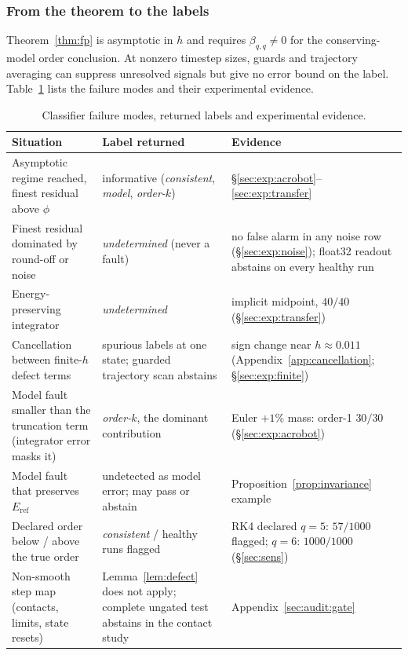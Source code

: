 \documentclass[10pt]{article}
\theoremstyle{definition}
\newcommand{\Eref}{E_{\mathrm{ref}}}
\begin{document}
\subsubsection{From the theorem to the labels}\label{sec:bridge}

Theorem~\ref{thm:fp} is asymptotic in $h$ and requires $\beta_{q,q}\ne0$ for
the conserving-model order conclusion. At nonzero timestep sizes, guards and trajectory
averaging can suppress unresolved signals but give no error bound on the
label. Table~\ref{tab:failure} lists the failure modes and their experimental
evidence.

\begin{table}[htbp]
\centering\small
\begin{tabular}{>{\raggedright\arraybackslash}p{4.9cm}>{\raggedright\arraybackslash}p{4.2cm}>{\raggedright\arraybackslash}p{5.6cm}}
\toprule
Situation & Label returned & Evidence \\
\midrule
Asymptotic regime reached, finest residual above $\phi$ & informative (\emph{consistent}, \emph{model}, \emph{order-$k$}) & \S\ref{sec:exp:acrobot}--\ref{sec:exp:transfer} \\
Finest residual dominated by round-off or noise & \emph{undetermined} (never a fault) & no false alarm in any noise row (\S\ref{sec:exp:noise}); float32 readout abstains on every healthy run \\
Energy-preserving integrator & \emph{undetermined} & implicit midpoint, $40/40$ (\S\ref{sec:exp:transfer}) \\
Cancellation between finite-$h$ defect terms & spurious labels at one state; guarded trajectory scan abstains & sign change near $h\approx0.011$ (Appendix~\ref{app:cancellation}; \S\ref{sec:exp:finite}) \\
Model fault smaller than the truncation term (integrator error masks it) & \emph{order-$k$}, the dominant contribution & Euler $+1\%$ mass: order-1 $30/30$ (\S\ref{sec:exp:acrobot}) \\
Model fault that preserves $\Eref$ & undetected as model error; may pass or abstain & Proposition~\ref{prop:invariance} example \\
Declared order below / above the true order & \emph{consistent} / healthy runs flagged & RK4 declared $q=5$: $57/1000$ flagged; $q=6$: $1000/1000$ (\S\ref{sec:sens}) \\
Non-smooth step map (contacts, limits, state resets) & Lemma~\ref{lem:defect} does not apply; complete ungated test abstains in the contact study & Appendix~\ref{sec:audit:gate} \\
\bottomrule
\end{tabular}
\caption{Classifier failure modes, returned labels and experimental evidence.}
\label{tab:failure}
\end{table}
\end{document}
